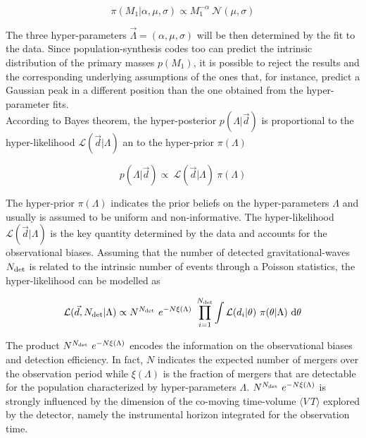\documentclass[a4paper,titlepage]{book}     	%
\begin{document}
\begin{equation}\label{eq:priormassprimary}
    \pi(M_1|\alpha,\mu,\sigma) \propto M_1^{-\alpha}~\mathcal{N} (\mu,\sigma)
\end{equation}

The three hyper-parameters $\vec{\Lambda} = (\alpha,\mu,\sigma)$ will be then determined by the fit to the data. Since population-synthesis codes too can predict the intrinsic distribution of the primary masses $p(M_1)$, it is possible to reject the results and the corresponding underlying assumptions of the ones that, for instance, predict a Gaussian peak in a different position than the one obtained from the hyper-parameter fits.\\


According to Bayes theorem, the hyper-posterior $p(\Lambda|\vec{d})$ is proportional to the hyper-likelihood $\mathcal{L}(\vec{d}|\Lambda)$ an to the hyper-prior $\pi(\Lambda)$

\begin{equation}\label{eq:hyperposterior}
     p(\Lambda|\vec{d}) \propto~\mathcal{L}(\vec{d}|\Lambda)~\pi(\Lambda)
\end{equation}

The hyper-prior $\pi(\Lambda)$ indicates the prior beliefs on the hyper-parameters $\Lambda$ and usually is assumed to be uniform and non-informative. The hyper-likelihood $\mathcal{L}(\vec{d}|\Lambda)$ is the key quantity determined by the data and accounts for the observational biases. Assuming that the number of detected gravitational-waves $N_{\rm det}$ is related to the intrinsic number of events through a Poisson statistics, the hyper-likelihood can be modelled as

\begin{equation}\label{eq:hyperlikelihood}
    \mathcal{L}(\vec{d}, N_{\rm det}| \Lambda) \propto N^{N_{\rm det}}~e^{-N\xi(\Lambda)} ~\prod_{i=1}^{N_{\rm det}} \int \mathcal{L}(d_i|\theta)~\pi(\theta|\Lambda)~\rm d\theta
\end{equation}

The product $N^{N_{\rm det}}~e^{-N\xi(\Lambda)}$ encodes the information on the observational biases and detection efficiency. In fact, $N$ indicates the expected number of mergers over the observation period while $\xi(\Lambda)$ is the fraction of mergers that are detectable for the population characterized by hyper-parameters $\Lambda$. $N^{N_{\rm det}}~e^{-N\xi(\Lambda)}$ is strongly influenced by the dimension of the co-moving time-volume $\langle V\,T\rangle$ explored by the detector, namely the instrumental horizon integrated for the observation time.
\end{document}
